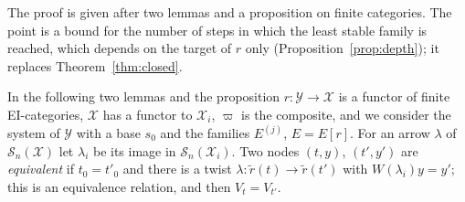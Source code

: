 \documentclass[11pt]{amsart}
\theoremstyle{definition}
\newcommand{\cX}{\mathcal X}
\newcommand{\cS}{\mathcal S}
\newcommand{\cY}{\mathcal Y}
\begin{document}
The proof is given after two lemmas and a proposition on finite
categories. The point is a bound for the number of steps in which the
least stable family is reached, which depends on the target of $r$
only (Proposition~\ref{prop:depth}); it replaces
Theorem~\ref{thm:closed}.

In the following two lemmas and the proposition $r\colon\cY\to\cX$ is a functor of finite
EI-categories, $\cX$ has a functor to $\cX_i$, $\varpi$ is the composite,
and we consider the system of $\cY$ with a base $s_0$ and the
families $E^{(j)}$, $E=E[r]$. For an arrow $\lambda$ of $\cS_n(\cX)$
let $\lambda_i$ be its image in $\cS_n(\cX_i)$. Two nodes $(t,y)$,
$(t',y')$ are \emph{equivalent} if $t_0=t'_0$ and there is a twist
$\lambda\colon\tilde r(t)\to\tilde r(t')$ with $W(\lambda_i)y=y'$;
this is an equivalence relation, and then $V_t=V_{t'}$.
\end{document}
